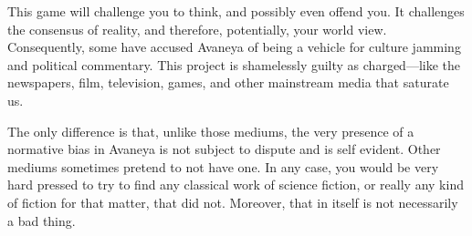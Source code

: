 This game will challenge you to think, and possibly even offend you. It challenges the consensus of reality, and therefore, potentially, your world view. Consequently, some have accused Avaneya of being a vehicle for culture jamming and political commentary. This project is shamelessly guilty as charged---like the newspapers, film, television, games, and other mainstream media that saturate us. 

The only difference is that, unlike those mediums, the very presence of a normative bias in Avaneya is not subject to dispute and is self evident. Other mediums sometimes pretend to not have one. In any case, you would be very hard pressed to try to find any classical work of science fiction, or really any kind of fiction for that matter, that did not. Moreover, that in itself is not necessarily a bad thing.


